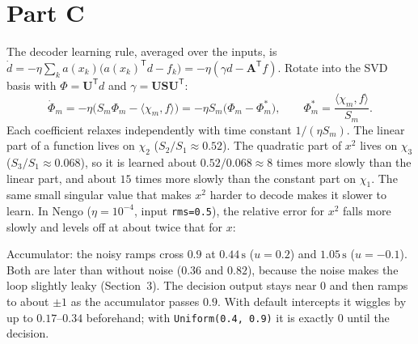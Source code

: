 \documentclass[11pt,letterpaper]{article}
\newcommand{\T}{\mathsf{T}}
\newcommand{\ans}[1]{\par\vspace{4pt}{\bfseries #1}\quad}
\begin{document}
\part*{Part C}

\ans{Q1}
The decoder learning rule, averaged over the inputs, is $\dot d = -\eta\sum_k a(x_k)\bigl(a(x_k)^\T d - f_k\bigr) = -\eta(\gamma d - \mathbf A^\T f)$. Rotate into the SVD basis with $\Phi = \mathbf U^\T d$ and $\gamma = \mathbf U\mathbf S\mathbf U^\T$:
\[
\dot\Phi_m = -\eta\bigl(S_m\Phi_m - \langle\chi_m, f\rangle\bigr) = -\eta S_m\bigl(\Phi_m - \Phi_m^*\bigr), \qquad \Phi_m^* = \frac{\langle\chi_m, f\rangle}{S_m}.
\]
Each coefficient relaxes independently with time constant $1/(\eta S_m)$. The linear part of a function lives on $\chi_2$ ($S_2/S_1 \approx 0.52$). The quadratic part of $x^2$ lives on $\chi_3$ ($S_3/S_1 \approx 0.068$), so it is learned about $0.52/0.068 \approx 8$ times more slowly than the linear part, and about $15$ times more slowly than the constant part on $\chi_1$. The same small singular value that makes $x^2$ harder to decode makes it slower to learn. In Nengo ($\eta = 10^{-4}$, input \texttt{rms=0.5}), the relative error for $x^2$ falls more slowly and levels off at about twice that for $x$:
\begin{center}
\end{center}

\ans{Q2}
Accumulator: the noisy ramps cross $0.9$ at $0.44\,\mathrm{s}$ ($u = 0.2$) and $1.05\,\mathrm{s}$ ($u = -0.1$). Both are later than without noise ($0.36$ and $0.82$), because the noise makes the loop slightly leaky (Section~3). The decision output stays near $0$ and then ramps to about $\pm1$ as the accumulator passes $0.9$. With default intercepts it wiggles by up to $0.17$--$0.34$ beforehand; with \texttt{Uniform(0.4, 0.9)} it is exactly $0$ until the decision.
\end{document}
